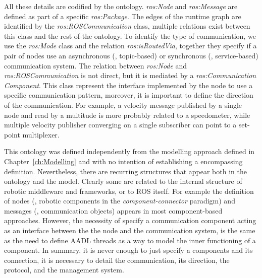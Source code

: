 All these details are codified by the ontology. \textit{ros:Node} and \textit{ros:Message} are defined as part of a specific \textit{ros:Package}. The edges of the runtime graph are identified by the \textit{ros:ROS\-Com\-mu\-ni\-ca\-tion} class, multiple relations exist between this class and the rest of the ontology. To identify the type of communication, we use the \textit{ros:Mode} class and the relation \textit{ros:isRoutedVia}, together they specify if a pair of nodes use an asynchronous (\ie, topic-based) or synchronous (\ie, service-based) communication system. The relation between \textit{ros:Node} and \textit{ros:ROS\-Com\-mu\-ni\-ca\-tion} is not direct, but it is mediated by a \textit{ros:Communication Component}. This class represent the interface implemented by the node to use a specific communication pattern, moreover, it is important to define the direction of the communication. For example, a velocity message published by a single node and read by a multitude is more probably related to a speedometer, while multiple velocity publisher converging on a single subscriber can point to a set-point multiplexer.

This ontology was defined independently from the modelling approach defined in Chapter~\ref{ch:Modelling} and with no intention of establishing a encompassing definition. Nevertheless, there are recurring structures that appear both in the ontology and the  model. Clearly some are related to the internal structure of robotic middleware and frameworks, or to ROS itself. For example the definition of nodes (\ie, robotic components in the \textit{component-connector} paradigm) and messages (\ie, communication objects) appears in most component-based approaches. However, the necessity of specify a communication component acting as an interface between the the node and the communication system, is the same as the need to define AADL threads as a way to model the inner functioning of a component. In summary, it is never enough to just specify a components and its connection, it is necessary to detail the communication, its direction, the protocol, and the management system.

